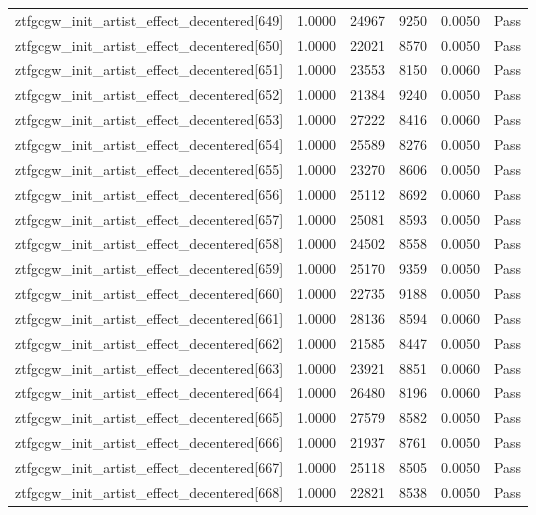 \begin{table}[htbp]
\begin{tabular}{llrrll}
ztfgcgw\_init\_artist\_effect\_decentered[649] & 1.0000 & 24967 & 9250 & 0.0050 & Pass \\
ztfgcgw\_init\_artist\_effect\_decentered[650] & 1.0000 & 22021 & 8570 & 0.0050 & Pass \\
ztfgcgw\_init\_artist\_effect\_decentered[651] & 1.0000 & 23553 & 8150 & 0.0060 & Pass \\
ztfgcgw\_init\_artist\_effect\_decentered[652] & 1.0000 & 21384 & 9240 & 0.0050 & Pass \\
ztfgcgw\_init\_artist\_effect\_decentered[653] & 1.0000 & 27222 & 8416 & 0.0060 & Pass \\
ztfgcgw\_init\_artist\_effect\_decentered[654] & 1.0000 & 25589 & 8276 & 0.0050 & Pass \\
ztfgcgw\_init\_artist\_effect\_decentered[655] & 1.0000 & 23270 & 8606 & 0.0050 & Pass \\
ztfgcgw\_init\_artist\_effect\_decentered[656] & 1.0000 & 25112 & 8692 & 0.0060 & Pass \\
ztfgcgw\_init\_artist\_effect\_decentered[657] & 1.0000 & 25081 & 8593 & 0.0050 & Pass \\
ztfgcgw\_init\_artist\_effect\_decentered[658] & 1.0000 & 24502 & 8558 & 0.0050 & Pass \\
ztfgcgw\_init\_artist\_effect\_decentered[659] & 1.0000 & 25170 & 9359 & 0.0050 & Pass \\
ztfgcgw\_init\_artist\_effect\_decentered[660] & 1.0000 & 22735 & 9188 & 0.0050 & Pass \\
ztfgcgw\_init\_artist\_effect\_decentered[661] & 1.0000 & 28136 & 8594 & 0.0060 & Pass \\
ztfgcgw\_init\_artist\_effect\_decentered[662] & 1.0000 & 21585 & 8447 & 0.0050 & Pass \\
ztfgcgw\_init\_artist\_effect\_decentered[663] & 1.0000 & 23921 & 8851 & 0.0060 & Pass \\
ztfgcgw\_init\_artist\_effect\_decentered[664] & 1.0000 & 26480 & 8196 & 0.0060 & Pass \\
ztfgcgw\_init\_artist\_effect\_decentered[665] & 1.0000 & 27579 & 8582 & 0.0050 & Pass \\
ztfgcgw\_init\_artist\_effect\_decentered[666] & 1.0000 & 21937 & 8761 & 0.0050 & Pass \\
ztfgcgw\_init\_artist\_effect\_decentered[667] & 1.0000 & 25118 & 8505 & 0.0050 & Pass \\
ztfgcgw\_init\_artist\_effect\_decentered[668] & 1.0000 & 22821 & 8538 & 0.0050 & Pass \\

\end{tabular}
\end{table}
